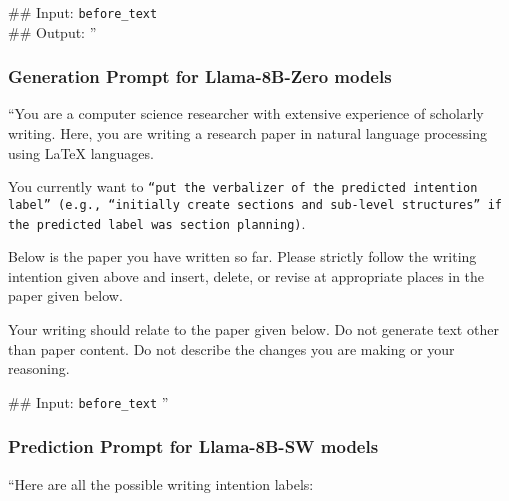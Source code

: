\#\# Input: \texttt{{before\_text}} \\
\#\# Output: 
''

\subsubsection{Generation Prompt for Llama-8B-Zero models}

``You are a computer science researcher with extensive experience of scholarly writing. Here, you are writing a research paper in natural language processing using LaTeX languages.

You currently want to \texttt{{``put the verbalizer of the predicted intention label''} (e.g., ``initially create sections and sub-level structures'' if the predicted label was section planning)}. 

Below is the paper you have written so far. Please strictly follow the writing intention given above and insert, delete, or revise at appropriate places in the paper given below.

Your writing should relate to the paper given below. Do not generate text other than paper content. Do not describe the changes you are making or your reasoning.

\#\# Input: \texttt{{before\_text}}
''

\subsubsection{Prediction Prompt for Llama-8B-SW models}

``Here are all the possible writing intention labels:

